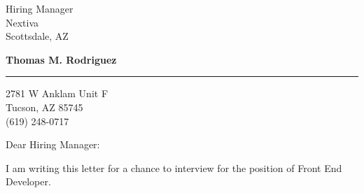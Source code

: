 \documentclass{letter} %
\begin{document}
\signature{Thomas M. Rodriguez}           %
\longindentation=0pt                       %
\let\raggedleft\raggedright                %
 
 
\begin{letter}{
Hiring Manager \\
Nextiva \\
Scottsdale, AZ}

\begin{center}
{\large\bf Thomas M. Rodriguez}
\end{center}
\medskip\hrule height 1pt
\begin{center}
{2781 W Anklam Unit F \\ Tucson, AZ 85745 \\ (619) 248-0717}
\end{center} \vfill %
 
 
\opening{Dear Hiring Manager:}
 

\noindent I am writing this letter for a chance to interview for the position of Front End Developer.
 


\end{letter}
\end{document}
